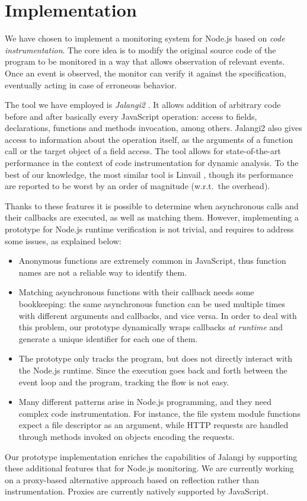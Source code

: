 \section{Implementation}
\label{sec:impl}
We have chosen to implement a monitoring system for Node.js based on \emph{code instrumentation}.
The core idea is to modify the original source code of the program to be monitored in a way that allows observation of relevant events.
Once an event is observed, the monitor can verify it against the specification, eventually acting in case of erroneous behavior.

The tool we have employed is \emph{Jalangi2} \cite{jalangi}.
It allows addition of arbitrary code before and after basically every JavaScript operation: access to fields, declarations, functions and methods invocation, among others. Jalangi2 also gives access to information about the operation itself, as the arguments of a function call or the target object of a field access.
The tool allows for state-of-the-art performance in the context of code instrumentation for dynamic analysis.
To the best of our knowledge, the most similar tool is Linvail \cite{linvail}, though its performance are reported to be worst by an order of magnitude (w.r.t.\ the overhead).

Thanks to these features it is possible to determine when asynchronous calls and their callbacks are executed, as well as matching them.
However, implementing a prototype for Node.js runtime verification is not trivial, and requires to address some issues, as explained below:
\begin{itemize}
\item Anonymous functions are extremely common in JavaScript, thus function names are not a reliable way to identify them.
\item Matching asynchronous functions with their callback needs some bookkeeping: the same asynchronous function can be used multiple times with different arguments and callbacks, and vice versa.
In order to deal with this problem, our prototype dynamically wraps callbacks \emph{at runtime} and generate a unique identifier for each one of them.
\item The prototype only tracks the program, but does not directly interact with the Node.js runtime.
Since the execution goes back and forth between the event loop and the program, tracking the flow is not easy.
\item Many different patterns arise in Node.js programming, and they need complex code instrumentation.
For instance, the file system module functions expect a file descriptor as an argument, while HTTP requests are handled through methods invoked on objects encoding the requests.
\end{itemize}
Our prototype implementation enriches the capabilities of Jalangi by supporting these additional features that for Node.js monitoring.
We are currently working on a proxy-based alternative approach based on reflection rather than instrumentation.
Proxies \cite{proxy} are currently natively supported by JavaScript.

